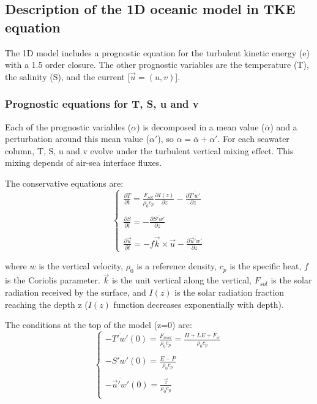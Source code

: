 \subsection{Description of the 1D oceanic model in TKE equation \label{sct_mod1d}}
The 1D model includes a prognostic equation for the turbulent kinetic energy (e) with a 1.5 order closure. The other prognostic variables are the temperature (T), the salinity (S), and the current [$\vec{u}=(u,v)$]. 

\subsubsection{Prognostic equations for T, S, u and v}
Each of the prognostic variables ($\alpha$) is decomposed in a mean value ($\overline{\alpha}$) and a perturbation around this mean value ($\alpha '$), so $\alpha=\overline{\alpha}+\alpha '$. 
For each seawater column, T, S, u and v evolve under the turbulent vertical mixing effect. This mixing depends of air-sea interface fluxes. 

The conservative equations are:
\begin{equation}
\left\{
\begin{array}{l}
\frac{\partial T}{\partial t}=\frac{F_{sol}}{\rho_{0}c_{p}}\frac{\partial I(z)}{\partial z}-\frac{\partial \overline{T'w'}}{\partial z}\\
\\
\frac{\partial S}{\partial t}=-\frac{\partial \overline{S'w'}}{\partial z}\\
\\
\frac{\partial \vec{u} 
}{\partial t}=-f\vec{k}\times \vec{u}-\frac{\partial \overline{\vec{u}'w'}}{\partial z}
\end{array}
\right.
\end{equation}

\noindent where $w$ is the vertical velocity, $\rho_{0}$ is a reference density, $c_{p}$ is the specific heat, $f$ is the Coriolis parameter. $\vec{k}$ is the unit vertical along the vertical, $F_{sol}$ is the solar radiation received by the surface, and $I(z)$ is the solar radiation fraction reaching the depth z ($I(z)$ function decreases exponentially with depth). 

The conditions at the top of the model (z=0) are:
\begin{equation}
\left\{
\begin{array}{l}
-\overline{T'w'}(0)=\frac{F_{nsol}}{\rho_{0}c_{p}}=\frac{H+LE+F_{ir}}{\rho_{0}c_{p}}\\
\\
-\overline{S'w'}(0)=\frac{E-P}{\rho_{0}c_{p}}\\
\\
-\overline{\vec{u}'w'}(0)=\frac{\vec{\tau}}{\rho_{0}c_{p}}\\
\end{array}
\right.
\label{eq_mod1D_interface}\end{equation}

